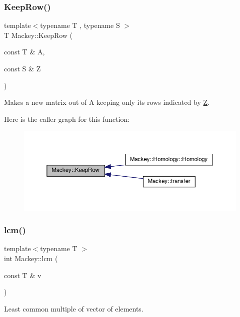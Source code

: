 \subsubsection{\texorpdfstring{Keep\+Row()}{KeepRow()}}
{\footnotesize\ttfamily template$<$typename T , typename S $>$ \\
T Mackey\+::\+Keep\+Row (\begin{DoxyParamCaption}\item[{const T \&}]{A,  }\item[{const S \&}]{Z }\end{DoxyParamCaption})}



Makes a new matrix out of A keeping only its rows indicated by \hyperlink{classZ}{Z}. 

Here is the caller graph for this function\+:\nopagebreak
\begin{figure}[H]
\begin{center}
\leavevmode
\includegraphics[width=350pt]{namespaceMackey_ad6870101d4fd762100a3115abc4a15db_icgraph}
\end{center}
\end{figure}
\mbox{\label{namespaceMackey_a5d8ae76ffb9440e27bfca124d26ee1b2}} 
\subsubsection{\texorpdfstring{lcm()}{lcm()}}
{\footnotesize\ttfamily template$<$typename T $>$ \\
int Mackey\+::lcm (\begin{DoxyParamCaption}\item[{const T \&}]{v }\end{DoxyParamCaption})}



Least common multiple of vector of elements. 

